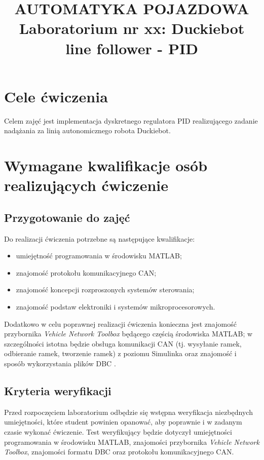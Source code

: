 \documentclass[11pt,onecolumn]{article}
\begin{document}
\title{\textbf{AUTOMATYKA POJAZDOWA} \\
Laboratorium nr xx: Duckiebot line follower - PID}
\date{}

\maketitle

\section{Cele ćwiczenia} \label{sec:cele}
%
Celem zajęć jest implementacja dyskretnego regulatora PID realizującego zadanie nadążania za linią autonomicznego robota Duckiebot.
%
\section{Wymagane kwalifikacje osób realizujących ćwiczenie} \label{sec:kwalifikacje}
%
\subsection{Przygotowanie do zajęć} \label{sub:przygotowanie}
%
Do realizacji ćwiczenia potrzebne są następujące kwalifikacje: 
\begin{itemize}
   \item umiejętność programowania w środowisku MATLAB;
   \item znajomość protokołu komunikacyjnego CAN;
   \item znajomość koncepcji rozproszonych systemów sterowania;
   \item znajomość podstaw elektroniki i systemów mikroprocesorowych.
\end{itemize}

Dodatkowo w celu poprawnej realizacji ćwiczenia konieczna jest znajomość przybornika \emph{Vehicle Network Toolbox} \cite{MathWorks19_VNT} będącego częścią środowiska MATLAB; w szczególności istotna będzie obsługa komunikacji CAN (tj. wysyłanie ramek, odbieranie ramek, tworzenie ramek) z poziomu Simulinka oraz znajomość i sposób wykorzystania plików DBC \cite{SL_DBC,Vector_DBC}. 

%
\subsection{Kryteria weryfikacji} \label{sub:kryteria_wer}
%
Przed rozpoczęciem laboratorium odbędzie się wstępna weryfikacja niezbędnych umiejętności, które student powinien opanować, aby poprawnie i w zadanym czasie wykonać ćwiczenie. Test weryfikujący będzie dotyczył umiejętności programowania w środowisku MATLAB, znajomości przybornika \emph{Vehicle Network Toolbox}, znajomości formatu DBC oraz protokołu komunikacyjnego CAN.
\end{document}
